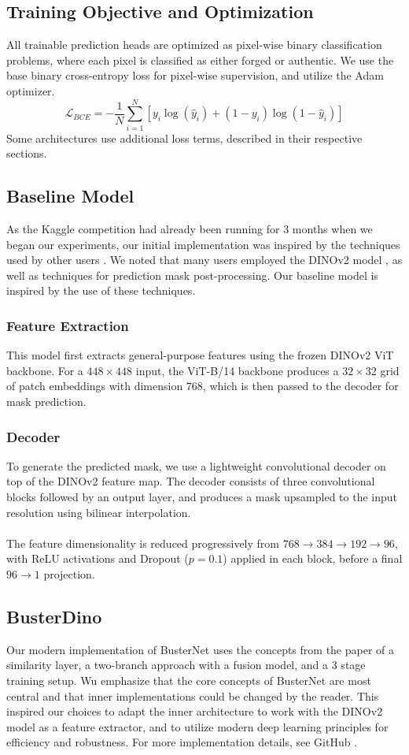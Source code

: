 \documentclass[final]{nldl}
\begin{document}
\subsection{Training Objective and Optimization}

All trainable prediction heads are optimized as pixel-wise binary classification problems, where each pixel is classified as either forged or authentic. We use the base binary cross-entropy loss for pixel-wise supervision, and utilize the Adam optimizer. 
\[
\mathcal{L}_{BCE} = - \frac{1}{N} \sum_{i=1}^{N} \left[ y_i \log(\hat{y}_i) + (1 - y_i)\log(1 - \hat{y}_i) \right]
\]
Some architectures use additional loss terms, described in their respective sections.
\subsection{Baseline Model}
As the Kaggle competition had already been running for 3 months when we began our experiments, our initial implementation was inspired by the techniques used by other users \cites{notebook1, notebook2}. We noted that many users employed the DINOv2 model \cite{oquab2023dinov2}, as well as techniques for prediction mask post-processing. Our baseline model is inspired by the use of these techniques.
\subsubsection{Feature Extraction}
This model first extracts general-purpose features using the frozen DINOv2 ViT backbone. For a \(448 \times 448\) input, the ViT-B/14 backbone produces a \(32 \times 32\) grid of patch embeddings with dimension \(768\), which is then passed to the decoder for mask prediction.
\subsubsection{Decoder}
To generate the predicted mask, we use a lightweight convolutional decoder on top of the DINOv2 feature map. The decoder consists of three convolutional blocks followed by an output layer, and produces a mask upsampled to the input resolution using bilinear interpolation.
\\\\
The feature dimensionality is reduced progressively from $768 \to 384 \to 192 \to 96$, with ReLU activations and Dropout ($p=0.1$) applied in each block, before a final $96 \to 1$ projection.
\subsection{BusterDino}
Our modern implementation of BusterNet \cite{wu2018busternet} uses the concepts from the paper of a similarity layer, a two-branch approach with a fusion model, and a 3 stage training setup.  Wu \etal emphasize that the core concepts of BusterNet are most central and that inner implementations could be changed by the reader. This inspired our choices to adapt the inner architecture to work with the DINOv2 model as a feature extractor, and to utilize modern deep learning principles for efficiency and robustness. For more implementation details, see GitHub \cite{einar_busternet}.
\end{document}
